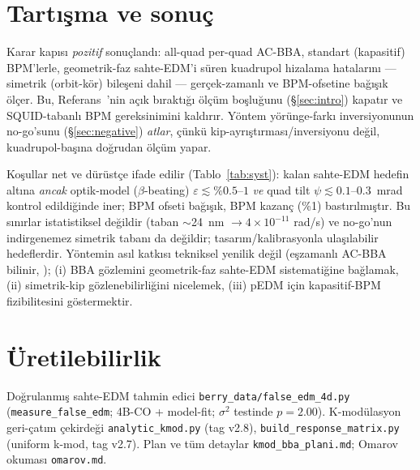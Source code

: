\documentclass[twocolumn,a4paper,10pt]{article}
\begin{document}
\section{Tartışma ve sonuç}
\label{sec:conclusion}
Karar kapısı \emph{pozitif} sonuçlandı: all-quad per-quad AC-BBA, standart
(kapasitif) BPM'lerle, geometrik-faz sahte-EDM'i süren kuadrupol hizalama
hatalarını --- simetrik (orbit-kör) bileşeni dahil --- gerçek-zamanlı ve
BPM-ofsetine bağışık ölçer. Bu, Referans~\cite{omarov2022}'nin açık bıraktığı
ölçüm boşluğunu (\S\ref{sec:intro}) kapatır ve SQUID-tabanlı BPM gereksinimini
kaldırır. Yöntem yörünge-farkı inversiyonunun no-go'sunu (\S\ref{sec:negative})
\emph{atlar}, çünkü kip-ayrıştırması/inversiyonu değil, kuadrupol-başına doğrudan
ölçüm yapar.

Koşullar net ve dürüstçe ifade edilir (Tablo~\ref{tab:syst}): kalan sahte-EDM
hedefin altına \emph{ancak} optik-model ($\beta$-beating) $\varepsilon \lesssim
\%0.5$--$1$ \emph{ve} quad tilt $\psi \lesssim 0.1$--$0.3$~mrad kontrol
edildiğinde iner; BPM ofseti bağışık, BPM kazanç (\%1) bastırılmıştır. Bu sınırlar
istatistiksel değildir (taban $\sim$24~nm $\to 4\times10^{-11}$ rad/s) ve no-go'nun
indirgenemez simetrik tabanı da değildir; tasarım/kalibrasyonla ulaşılabilir
hedeflerdir. Yöntemin asıl katkısı tekniksel yenilik değil
(eşzamanlı AC-BBA bilinir, \cite{huang2022}); (i) BBA gözlemini geometrik-faz
sahte-EDM sistematiğine bağlamak, (ii) simetrik-kip gözlenebilirliğini nicelemek,
(iii) pEDM için kapasitif-BPM fizibilitesini göstermektir.

\section*{Üretilebilirlik}
Doğrulanmış sahte-EDM tahmin edici \texttt{berry\_data/false\_edm\_4d.py}
(\texttt{measure\_false\_edm}; 4B-CO + model-fit; $\sigma^2$ testinde $p=2.00$).
K-modülasyon geri-çatım çekirdeği \texttt{analytic\_kmod.py} (tag v2.8),
\texttt{build\_response\_matrix.py} (uniform k-mod, tag v2.7). Plan ve tüm
detaylar \texttt{kmod\_bba\_plani.md}; Omarov okuması \texttt{omarov.md}.
\end{document}
